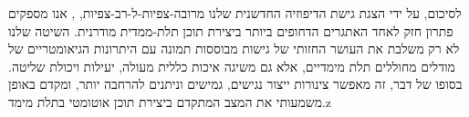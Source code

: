 {לסיכום, על ידי הצגת גישת הדיפוזיה החדשנית שלנו מרובה-צפיות-ל-רב-צפיות, \ourname{}, אנו מספקים פתרון חזק לאחד האתגרים הדחופים ביותר ביצירת תוכן תלת-ממדית מודרנית. השיטה שלנו לא רק משלבת את העושר החזותי של גישות מבוססות תמונה עם היתרונות הגיאומטריים של מודלים מחוללים תלת מימדיים, אלא גם משיגה איכות כללית מעולה, יעילות ויכולת שליטה. בסופו של דבר, זה מאפשר צינורות ייצור נגישים, גמישים וניתנים להרחבה יותר, ומקדם באופן משמעותי את המצב המתקדם ביצירת תוכן אוטומטי בתלת מימד.z
} %

